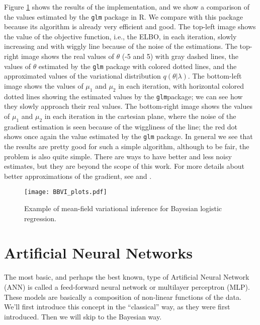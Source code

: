 Figure \ref{fig:BBVI_plots} shows the results of the implementation, and we show a comparison of the values estimated by the \texttt{glm} package in R. We compare with this package because its algorithm is already very efficient and good. The top-left image shows the value of the objective function, i.e., the ELBO, in each iteration, slowly increasing and with wiggly line because of the noise of the estimations. The top-right image shows the real values of $\theta$ (-5 and 5) with gray dashed lines, the values of $\theta$ estimated by the \texttt{glm} package with colored dotted lines, and the approximated values of the variational distribution $q(\theta | \lambda)$. The bottom-left image shows the values of $\mu_1$ and $\mu_2$ in each iteration, with horizontal colored dotted lines showing the estimated values by the \texttt{glm}package; we can see how they slowly approach their real values. The bottom-right image shows the values of $\mu_1$ and $\mu_2$ in each iteration in the cartesian plane, where the noise of the gradient estimation is seen because of the wiggliness of the line; the red dot shows once again the value estimated by the \texttt{glm} package. In general we see that the results are pretty good for such a simple algorithm, although to be fair, the problem is also quite simple. There are ways to have better and less noisy estimates, but they are beyond the scope of this work. For more details about better approximations of the gradient, see \cite{kucukelbir2017automatic} and \cite{ranganath2014black}.

\begin{figure}[H]
    \centering
    \texttt{[image: BBVI\_plots.pdf]}
    \caption{Example of mean-field variational inference for Bayesian logistic regression.}
    \label{fig:BBVI_plots}
\end{figure}


\section{Artificial Neural Networks}

The most basic, and perhaps the best known, type of Artificial Neural Network (ANN) is called a feed-forward neural network or multilayer perceptron (MLP). These models are basically a composition of non-linear functions of the data. We'll first introduce this concept in the ``classical'' way, as they were first introduced. Then we will skip to the Bayesian way.

